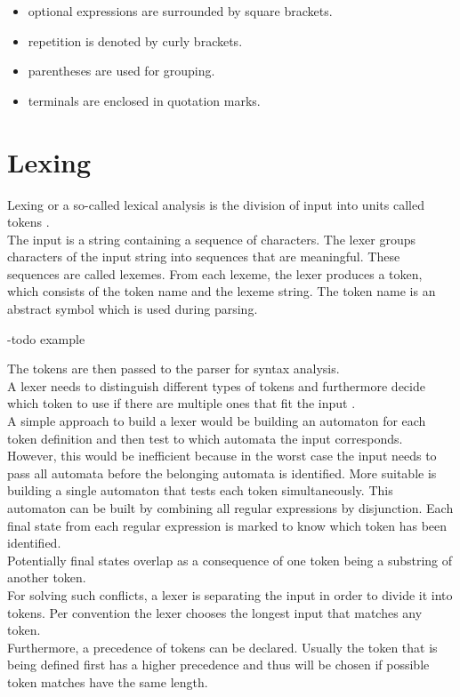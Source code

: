 \begin{itemize}%
	\item optional expressions are surrounded by square brackets.
	\item repetition is denoted by curly brackets.
	\item parentheses are used for grouping.
	\item terminals are enclosed in quotation marks.
\end{itemize}
\label{itemize:BackgroundBNF}
\cite{EBNF.1977}

\section{Lexing}\label{sec:BackgroundLexer}
Lexing or a so-called lexical analysis is the division of input into units called tokens \cite{LexYacc.1992}.\\
The input is a string containing a sequence of characters.
The lexer groups characters of the input string into sequences that are meaningful. These sequences are called lexemes. From each lexeme, the lexer produces a token, which consists of the token name and the lexeme string. The token name is an abstract symbol which is used during parsing. \cite{Aho.2007}

-todo example

The tokens are then passed to the parser for syntax analysis.\\
A lexer needs to distinguish different types of tokens and furthermore decide which token to use if there are multiple ones that fit the input \cite{Mogensen.2017}.\\
A simple approach to build a lexer would be building an automaton for each token definition and then test to which automata the input corresponds.\\
However, this would be inefficient because in the worst case the input needs to pass all automata before the belonging automata is identified.
More suitable is building a single automaton that tests each token simultaneously.
This automaton can be built by combining all regular expressions by disjunction.
Each final state from each regular expression is marked to know which token has been identified.\\
Potentially final states overlap as a consequence of one token being a substring of another token. \\
For solving such conflicts, a lexer is separating the input in order to divide it into tokens.
Per convention the lexer chooses the longest input that matches any token. \cite{Mogensen.2017} \\
Furthermore, a precedence of tokens can be declared. Usually the token that is being defined first has a higher precedence and thus will be chosen if possible token matches have the same length. \cite{Mogensen.2017}

